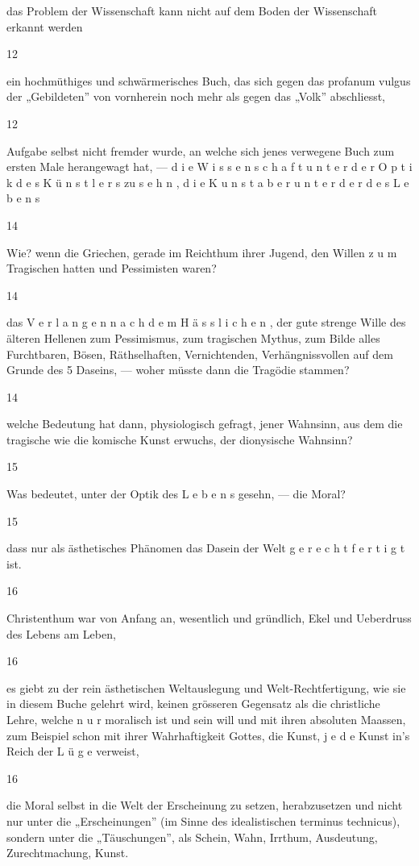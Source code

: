 \documentclass[
  letterpaper,
  DIV=11,
  numbers=noendperiod]{scrartcl}
\begin{document}
das Problem der Wissenschaft kann nicht auf dem Boden der Wissenschaft
erkannt werden

12

ein hochmüthiges und schwärmerisches Buch, das sich gegen das profanum
vulgus der „Gebildeten'' von vornherein noch mehr als gegen das „Volk''
abschliesst,

12

Aufgabe selbst nicht fremder wurde, an welche sich jenes verwegene Buch
zum ersten Male herangewagt hat, --- d i e W i s s e n s c h a f t u n t
e r d e r O p t i k d e s K ü n s t l e r s zu s e h n , d i e K u n s t
a b e r u n t e r d e r d e s L e b e n s

14

Wie? wenn die Griechen, gerade im Reichthum ihrer Jugend, den Willen z u
m Tragischen hatten und Pessimisten waren?

14

das V e r l a n g e n n a c h d e m H ä s s l i c h e n , der gute
strenge Wille des älteren Hellenen zum Pessimismus, zum tragischen
Mythus, zum Bilde alles Furchtbaren, Bösen, Räthselhaften,
Vernichtenden, Verhängnissvollen auf dem Grunde des 5 Daseins, --- woher
müsste dann die Tragödie stammen?

14

welche Bedeutung hat dann, physiologisch gefragt, jener Wahnsinn, aus
dem die tragische wie die komische Kunst erwuchs, der dionysische
Wahnsinn?

15

Was bedeutet, unter der Optik des L e b e n s gesehn, --- die Moral?

15

dass nur als ästhetisches Phänomen das Dasein der Welt g e r e c h t f e
r t i g t ist.

16

Christenthum war von Anfang an, wesentlich und gründlich, Ekel und
Ueberdruss des Lebens am Leben,

16

es giebt zu der rein ästhetischen Weltauslegung und Welt-Rechtfertigung,
wie sie in diesem Buche gelehrt wird, keinen grösseren Gegensatz als die
christliche Lehre, welche n u r moralisch ist und sein will und mit
ihren absoluten Maassen, zum Beispiel schon mit ihrer Wahrhaftigkeit
Gottes, die Kunst, j e d e Kunst in's Reich der L ü g e verweist,

16

die Moral selbst in die Welt der Erscheinung zu setzen, herabzusetzen
und nicht nur unter die „Erscheinungen'' (im Sinne des idealistischen
terminus technicus), sondern unter die „Täuschungen'', als Schein, Wahn,
Irrthum, Ausdeutung, Zurechtmachung, Kunst.
\end{document}
